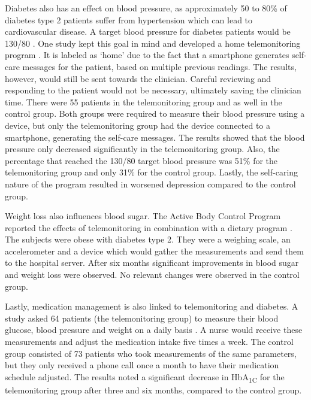         Diabetes also has an effect on blood pressure, as approximately 50 to 80\% of diabetes type 2 patients suffer from hypertension which can lead to cardiovascular disease. A target blood pressure for diabetes patients would be 130/80 \cite{landsberg2004diabetes}. One study kept this goal in mind and developed a home telemonitoring program \cite{logan2012effect}. It is labeled as `home' due to the fact that a smartphone generates self-care messages for the patient, based on multiple previous readings. The results, however, would still be sent towards the clinician. Careful reviewing and responding to the patient would not be necessary, ultimately saving the clinician time. There were 55 patients in the telemonitoring group and as well in the control group. Both groups were required to measure their blood pressure using a device, but only the telemonitoring group had the device connected to a smartphone, generating the self-care messages. The results showed that the blood pressure only decreased significantly in the telemonitoring group. Also, the percentage that reached the 130/80 target blood pressure was 51\% for the telemonitoring group and only 31\% for the control group. Lastly, the self-caring nature of the program resulted in worsened depression compared to the control group.

        Weight loss also influences blood sugar. The Active Body Control Program reported the effects of telemonitoring in combination with a dietary program \cite{luley2011weight}. The subjects were obese with diabetes type 2. They were a weighing scale, an accelerometer and a device which would gather the measurements and send them to the hospital server. After six months significant improvements in blood sugar and weight loss were observed. No relevant changes were observed in the control group.

        Lastly, medication management is also linked to telemonitoring and diabetes. A study asked 64 patients (the telemonitoring group) to measure their blood glucose, blood pressure and weight on a daily basis \cite{stone2009active}. A nurse would receive these measurements and adjust the medication intake five times a week. The control group consisted of 73 patients who took measurements of the same parameters, but they only received a phone call once a month to have their medication schedule adjusted. The results noted a significant decrease in HbA\textsubscript{1C} for the telemonitoring group after three and six months, compared to the control group.

